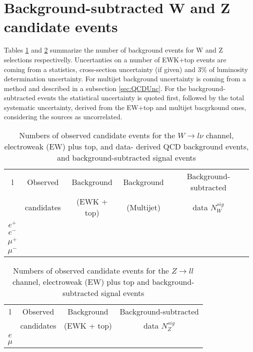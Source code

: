 \section{Background-subtracted W and Z candidate events}
Tables \ref{tab:BkgWlnu} and \ref{tab:BkgZll} summarize the number of background events for W and Z selections respectivelly. Uncertanties on a number of EWK+top events are coming from a statistics, cross-section uncertainty (if given) and 3\% of luminosity determination uncertainty. For multijet background uncertainty is coming from a method and described in a subsection \ref{sec:QCDUnc}. For the background-subtracted events the statistical uncertainty is quoted first, followed by the total systematic uncertainty, derived from the EW+top and multijet bacgrkound ones, considering the sources as uncorrelated. 

\begin{table}[!tbp]
    \caption{Numbers of observed candidate events for the $W \to l\nu$ channel, electroweak (EW) plus top, and data- derived QCD background events, and background-subtracted signal events}
	\label{tab:BkgWlnu}
	\begin{center}
		\begin{tabular}{c || c || c | c || c  }
		\hline
		l & Observed & Background & Background & Background-subtracted \\
		 & candidates & (EWK + top) & (Multijet) & data $N_{W}^{sig}$ \\
		 \hline
		 $e^{+}$ & \ntotWplusenu & \nEWttbarbkgWplusenu & \nQCDWplusenu & \ntotsignalWplusenu \\
		 $e^{-}$ & \ntotWminenu & \nEWttbarbkgWminenu & \nQCDWminenu & \ntotsignalWminenu \\
		 $\mu^{+}$ & \ntotWplusmunu & \nEWttbarbkgWplusmunu & \nQCDWplusmunu & \ntotsignalWplusmunu \\
		 $\mu^{-}$ & \ntotWminmunu &\nEWttbarbkgWminmunu & \nQCDWminmunu & \ntotsignalWminmunu \\
		 \hline
		 \end{tabular}
   \end{center}
\end{table}

\begin{table}[!tbp]
    \caption{Numbers of observed candidate events for the $Z \to ll$ channel, electroweak (EW) plus top and background-subtracted signal events}
	\label{tab:BkgZll}
	\begin{center}
		\begin{tabular}{c | c | c | c}
		\hline
		l & Observed & Background & Background-subtracted \\
		 & candidates & (EWK + top)  & data $N_{Z}^{sig}$ \\
		 \hline
		 $e$ & \ntotZee & \nEWttbarbkgZee  & \ntotsignalZee \\
		 $\mu$ & \ntotZmumu &\nEWttbarbkgZmumu  & \ntotsignalZmumu \\
		 \hline
		 \end{tabular}
   \end{center}
\end{table}
